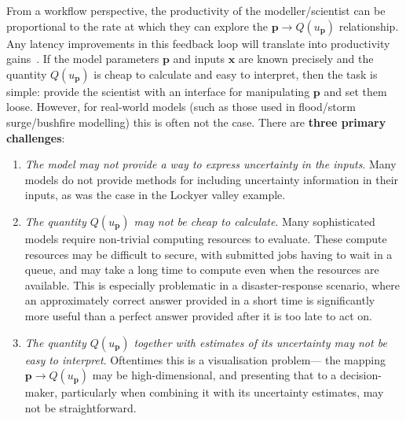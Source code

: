 \documentclass[a4paper,fontsize=12pt]{scrartcl}
\begin{document}
From a workflow perspective, the productivity of the modeller/scientist can be 
proportional to the rate at which they can explore the
$\mathbf{p} \rightarrow Q(u_{\mathbf{p}})$ relationship. Any latency
improvements in this feedback loop will translate into productivity
gains~\parencite{liu_effects_2014}.
If the model parameters $\mathbf{p}$ and inputs $\mathbf{x}$ are known
precisely and the quantity $Q(u_{\mathbf{p}})$ is cheap to calculate
and easy to interpret, then the task is simple: provide the scientist
with an interface for manipulating $\mathbf{p}$ and set them loose.
However, for real-world models (such as those used in flood/storm
surge/bushfire modelling) this is often not the case. There are \textbf{three
primary challenges}:
\begin{enumerate}
\item \emph{The model may not provide a way to express uncertainty in
    the inputs}. Many models do not provide methods for including
  uncertainty information in their inputs, as was the case in the
  Lockyer valley example.
\item \emph{The quantity $Q(u_{\mathbf{p}})$ may not be cheap to
    calculate}. Many
  sophisticated models require non-trivial computing resources to evaluate. These compute resources may be
  difficult to secure, with submitted jobs having to wait in a queue, and may
  take a long time to compute even when the resources are available.
  This is especially problematic in a disaster-response scenario,
  where an approximately correct answer provided in a short time is
  significantly more useful than a perfect answer provided after it is
  too late to act on.
\item \emph{The quantity $Q(u_{\mathbf{p}})$ together with estimates of its uncertainty may not be easy to
    interpret}. Oftentimes this is a visualisation problem---
  the mapping $\mathbf{p} \rightarrow Q(u_{\mathbf{p}})$ may be high-dimensional,
  and presenting that to a decision-maker, particularly when combining it with its uncertainty estimates, may not be straightforward.
\end{enumerate}
\end{document}
